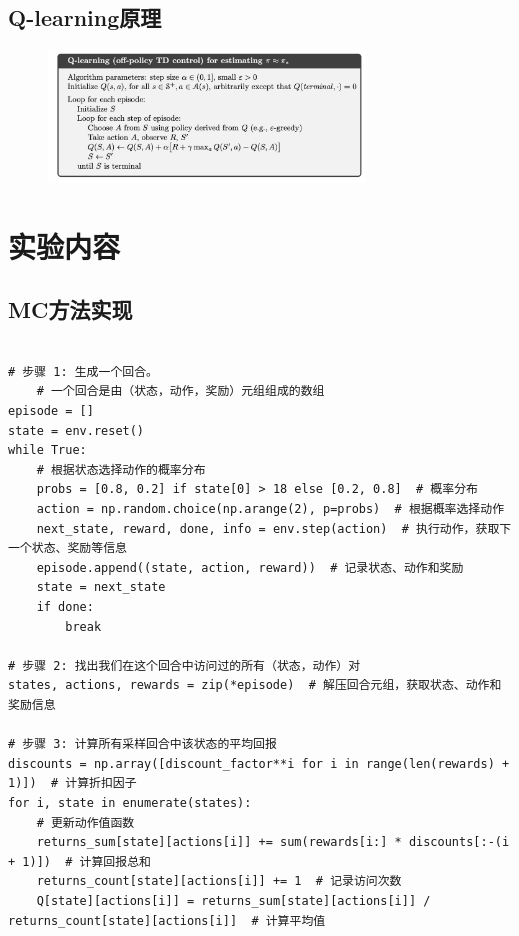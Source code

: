 \documentclass{ctexart}
\begin{document}
\subsection*{Q-learning原理}
\begin{figure}[H]
    \centering
    \includegraphics[width=0.75\textwidth]{3.png}
\end{figure}

\section{实验内容}
\subsection*{MC方法实现}
\begin{verbatim}

# 步骤 1: 生成一个回合。
    # 一个回合是由（状态，动作，奖励）元组组成的数组
episode = []
state = env.reset()
while True:
    # 根据状态选择动作的概率分布
    probs = [0.8, 0.2] if state[0] > 18 else [0.2, 0.8]  # 概率分布
    action = np.random.choice(np.arange(2), p=probs)  # 根据概率选择动作
    next_state, reward, done, info = env.step(action)  # 执行动作，获取下一个状态、奖励等信息
    episode.append((state, action, reward))  # 记录状态、动作和奖励
    state = next_state
    if done:
        break

# 步骤 2: 找出我们在这个回合中访问过的所有（状态，动作）对
states, actions, rewards = zip(*episode)  # 解压回合元组，获取状态、动作和奖励信息

# 步骤 3: 计算所有采样回合中该状态的平均回报
discounts = np.array([discount_factor**i for i in range(len(rewards) + 1)])  # 计算折扣因子
for i, state in enumerate(states):
    # 更新动作值函数
    returns_sum[state][actions[i]] += sum(rewards[i:] * discounts[:-(i + 1)])  # 计算回报总和
    returns_count[state][actions[i]] += 1  # 记录访问次数
    Q[state][actions[i]] = returns_sum[state][actions[i]] / returns_count[state][actions[i]]  # 计算平均值


\end{verbatim}
\end{document}
